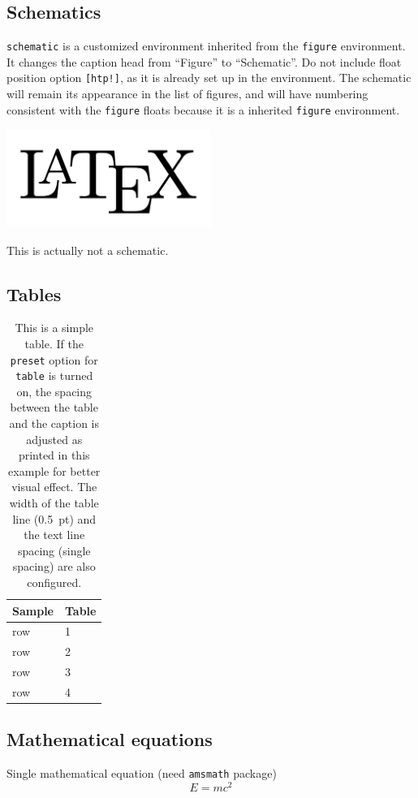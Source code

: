 \documentclass[draft]{emory}
\begin{document}
\subsection{Schematics}

\Verb|schematic| is a customized environment inherited from the \Verb|figure|
environment. It changes the caption head from ``Figure'' to ``Schematic''. Do 
not include float position option
\Verb|[htp!]|, as it is already set up in the environment. The schematic will 
remain its appearance in the list of figures, and will have numbering 
consistent with the \Verb|figure| floats because it is a inherited 
\Verb|figure| environment.

\begin{schematic}
	\centering
  \includegraphics[width=0.5\textwidth]{LaTeXLogo.png}
  \caption{This is actually not a schematic.\label{schematic}}
\end{schematic}


\subsection{Tables}

\begin{table}[htp!]
  \centering
  \caption[This is a simple table]{This is a simple table. \label{table} If the 
  \protect\Verb|preset| 
  option 
  	for \protect\Verb|table| is turned on, the spacing between the table and 
  	the 
  	caption is adjusted as printed in this example for better visual effect. 
  	The width of the table line (0.5~pt) and the text line spacing (single 
  	spacing) are also configured.}
  \begin{tabular}{l p{}}
    \hline
    Sample & Table \\
    \hline 
    row & 1 \\
    row & 2 \\
    row & 3 \\
    row & 4 \\
    \hline
  \end{tabular}
\end{table}

\subsection{Mathematical equations}
Single mathematical equation (need \Verb|amsmath| package)
\begin{equation}
  E = mc^2 \label{math:single}
\end{equation}
\end{document}
